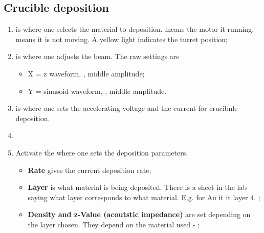  \subsection{Crucible deposition}
  \begin{enumerate}
  	\item \textbf{} is where one selects the material to deposition.  means the motor it running,  means it is not moving. A yellow light indicates the turret position;
  	\item \textbf{} is where one adjusts the beam. The raw settings are
  	\begin{itemize}
  		\item X = z waveform, , middle amplitude;
  		\item Y = sinusoid waveform, , middle amplitude.
  	\end{itemize}
  	\item \textbf{} is where one sets the accelerating voltage and the current for crucibnle deposition.
  	\item {} 
  		\item Activate the \textbf{} where one sets the deposition parameters.  
  	\begin{itemize}
  		\item \textbf{Rate} gives the current deposition rate;
  		\item \textbf{Layer} is what material is being deposited. There is a sheet in the lab saying what layer corresponds to what material. E.g. for Au it it layer 4. ;
  		\item \textbf{Density and z-Value (acoutstic impedance)} are set depending on the layer chosen. They depend on the material used - ;

\end{itemize}
\end{enumerate}

